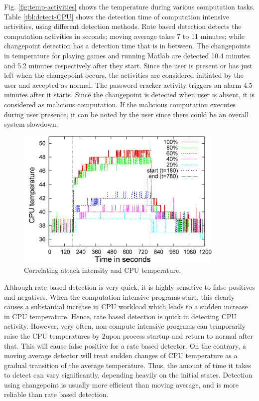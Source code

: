 Fig. \ref{fig:temp-activities} shows the temperature during various
computation tasks. Table \ref{tbl:detect-CPU} shows the detection time of computation intensive activities, using different detection methods. Rate based detection detects the computation activities in seconds; moving average takes 7 to 11 minutes; while changepoint detection has a detection time that is in between. 
The changepoints in temperature for playing games
and running Matlab are detected 10.4 minutes and 5.2
minutes respectively after they start. Since the user is present or
has just left when the changepoint occurs, the activities are considered
initiated by the user and accepted as normal. The password cracker
activity triggers an alarm 4.5 minutes after it starts. Since the
changepoint is detected when user is absent, it is considered as
malicious computation. If the malicious computation executes during
user presence, it can be noted by the user since there could be an
overall system slowdown.

\begin{figure}[tb]
\centering
\includegraphics[width=0.9\textwidth]{sensor/passwd-line.png}
\caption{Correlating attack intensity and CPU temperature. }
\label{fig:pwd-vary}
\end{figure}

Although rate based detection is very quick, it is highly sensitive to
false positives and negatives. When the computation intensive programs start, 
this clearly causes a substantial increase in CPU workload
which leads to a sudden increase in CPU temperature. 
Hence, rate based detection is quick in detecting CPU activity.
However, very often, non-compute intensive programs can temporarily raise the CPU temperatures by 2\degree upon process startup and return to normal 
after that. This will cause false positive for a rate based detector. 
On the contrary, a moving average detector will treat
sudden changes of CPU temperature as a gradual transition 
of the average temperature. Thus, the amount of time
it takes to detect can vary significantly,
depending heavily on the initial states. 
Detection using changepoint is usually more efficient than moving average, 
and is more reliable than rate based detection.


